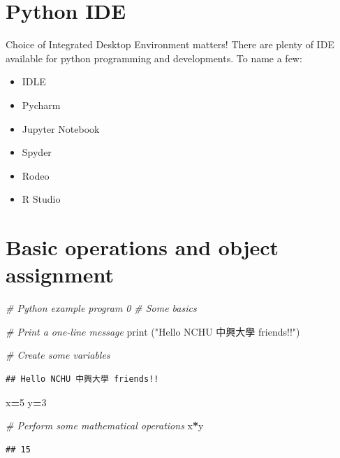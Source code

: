 \documentclass[]{book}
\newenvironment{Shaded}{\begin{snugshade}}{\end{snugshade}}
\newcommand{\BuiltInTok}[1]{#1}
\newcommand{\CommentTok}[1]{\textcolor[rgb]{0.56,0.35,0.01}{\textit{#1}}}
\newcommand{\DecValTok}[1]{\textcolor[rgb]{0.00,0.00,0.81}{#1}}
\newcommand{\NormalTok}[1]{#1}
\newcommand{\OperatorTok}[1]{\textcolor[rgb]{0.81,0.36,0.00}{\textbf{#1}}}
\newcommand{\StringTok}[1]{\textcolor[rgb]{0.31,0.60,0.02}{#1}}
\providecommand{\tightlist}{%
  \setlength{\itemsep}{0pt}\setlength{\parskip}{0pt}}
\begin{document}
\hypertarget{python-ide}{%
\section{Python IDE}\label{python-ide}}

Choice of Integrated Desktop Environment matters! There are plenty of IDE available for python programming and developments. To name a few:

\begin{itemize}
\tightlist
\item
  IDLE
\item
  Pycharm
\item
  Jupyter Notebook
\item
  Spyder
\item
  Rodeo
\item
  R Studio
\end{itemize}

\hypertarget{basic-operations-and-object-assignment-1}{%
\section{Basic operations and object assignment}\label{basic-operations-and-object-assignment-1}}

\begin{Shaded}
\begin{Highlighting}[]
\CommentTok{# Python example program 0}
\CommentTok{# Some basics}

\CommentTok{# Print a one-line message}
\BuiltInTok{print}\NormalTok{ (}\StringTok{"Hello NCHU 中興大學 friends!!"}\NormalTok{)}

\CommentTok{# Create some variables}
\end{Highlighting}
\end{Shaded}

\begin{verbatim}
## Hello NCHU 中興大學 friends!!
\end{verbatim}

\begin{Shaded}
\begin{Highlighting}[]
\NormalTok{x}\OperatorTok{=}\DecValTok{5}
\NormalTok{y}\OperatorTok{=}\DecValTok{3}

\CommentTok{# Perform some mathematical operations}
\NormalTok{x}\OperatorTok{*}\NormalTok{y}
\end{Highlighting}
\end{Shaded}

\begin{verbatim}
## 15
\end{verbatim}
\end{document}
